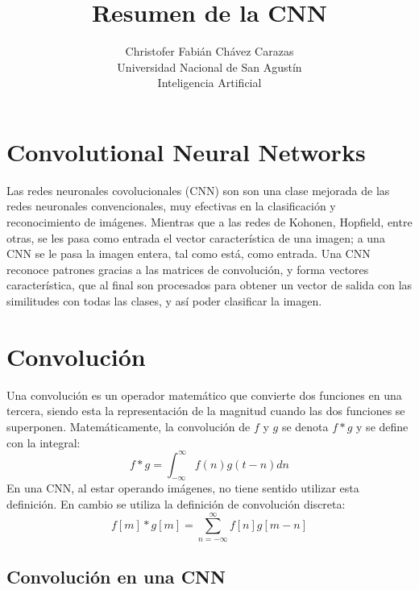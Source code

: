 \documentclass[a4paper,12pt]{article}
\begin{document}
\title{Resumen de la CNN}
\author{
Christofer Fabián Chávez Carazas \\
\small{Universidad Nacional de San Agustín} \\
\small{Inteligencia Artificial}
}

\maketitle


\section{Convolutional Neural Networks}

Las redes neuronales covolucionales (CNN) son son una clase mejorada de las redes neuronales convencionales, muy efectivas en la
clasificación y reconocimiento de imágenes. Mientras que a las redes de Kohonen, Hopfield, entre otras, se les pasa como entrada
el vector característica de una imagen; a una CNN se le pasa la imagen entera, tal como está, como entrada. Una CNN reconoce
patrones gracias a las matrices de convolución, y forma vectores característica, que al final son procesados para obtener
un vector de salida con las similitudes con todas las clases, y así poder clasificar la imagen.

\section{Convolución}

Una convolución es un operador matemático que convierte dos funciones en una tercera, siendo esta la representación de la magnitud
cuando las dos funciones se superponen. Matemáticamente, la convolución de $f$ y $g$ se denota $f*g$ y se define con la integral:
$$f*g = \int_{-\infty}^{\infty} f(n)g(t-n)dn$$
En una CNN, al estar operando imágenes, no tiene sentido utilizar esta definición. En cambio se utiliza la definición de
convolución discreta:
$$f[m]*g[m] = \sum_{n=-\infty}^{\infty}f[n]g[m-n]$$

\subsection{Convolución en una CNN}
\end{document}
